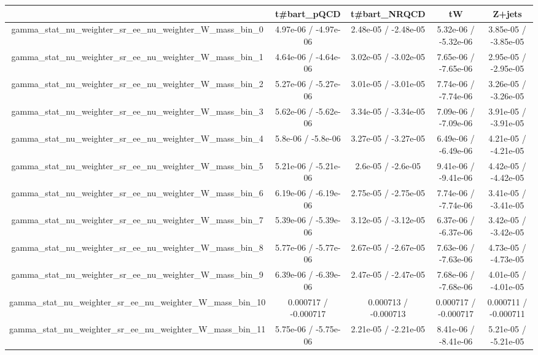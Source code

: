 \documentclass[10pt]{article}
\begin{document}
\begin{table}[htbp]
\begin{center}
\begin{tabular}{|c|c|c|c|c|}
\hline 
      & t#bar{t}_{pQCD}      & t#bar{t}_{NRQCD}      & tW      & Z+jets \\ 
\hline 
  gamma_stat_nu_weighter_sr_ee_nu_weighter_W_mass_bin_0 & 4.97e-06 / -4.97e-06 & 2.48e-05 / -2.48e-05 & 5.32e-06 / -5.32e-06 & 3.85e-05 / -3.85e-05 \\ 
  gamma_stat_nu_weighter_sr_ee_nu_weighter_W_mass_bin_1 & 4.64e-06 / -4.64e-06 & 3.02e-05 / -3.02e-05 & 7.65e-06 / -7.65e-06 & 2.95e-05 / -2.95e-05 \\ 
  gamma_stat_nu_weighter_sr_ee_nu_weighter_W_mass_bin_2 & 5.27e-06 / -5.27e-06 & 3.01e-05 / -3.01e-05 & 7.74e-06 / -7.74e-06 & 3.26e-05 / -3.26e-05 \\ 
  gamma_stat_nu_weighter_sr_ee_nu_weighter_W_mass_bin_3 & 5.62e-06 / -5.62e-06 & 3.34e-05 / -3.34e-05 & 7.09e-06 / -7.09e-06 & 3.91e-05 / -3.91e-05 \\ 
  gamma_stat_nu_weighter_sr_ee_nu_weighter_W_mass_bin_4 & 5.8e-06 / -5.8e-06 & 3.27e-05 / -3.27e-05 & 6.49e-06 / -6.49e-06 & 4.21e-05 / -4.21e-05 \\ 
  gamma_stat_nu_weighter_sr_ee_nu_weighter_W_mass_bin_5 & 5.21e-06 / -5.21e-06 & 2.6e-05 / -2.6e-05 & 9.41e-06 / -9.41e-06 & 4.42e-05 / -4.42e-05 \\ 
  gamma_stat_nu_weighter_sr_ee_nu_weighter_W_mass_bin_6 & 6.19e-06 / -6.19e-06 & 2.75e-05 / -2.75e-05 & 7.74e-06 / -7.74e-06 & 3.41e-05 / -3.41e-05 \\ 
  gamma_stat_nu_weighter_sr_ee_nu_weighter_W_mass_bin_7 & 5.39e-06 / -5.39e-06 & 3.12e-05 / -3.12e-05 & 6.37e-06 / -6.37e-06 & 3.42e-05 / -3.42e-05 \\ 
  gamma_stat_nu_weighter_sr_ee_nu_weighter_W_mass_bin_8 & 5.77e-06 / -5.77e-06 & 2.67e-05 / -2.67e-05 & 7.63e-06 / -7.63e-06 & 4.73e-05 / -4.73e-05 \\ 
  gamma_stat_nu_weighter_sr_ee_nu_weighter_W_mass_bin_9 & 6.39e-06 / -6.39e-06 & 2.47e-05 / -2.47e-05 & 7.68e-06 / -7.68e-06 & 4.01e-05 / -4.01e-05 \\ 
  gamma_stat_nu_weighter_sr_ee_nu_weighter_W_mass_bin_10 & 0.000717 / -0.000717 & 0.000713 / -0.000713 & 0.000717 / -0.000717 & 0.000711 / -0.000711 \\ 
  gamma_stat_nu_weighter_sr_ee_nu_weighter_W_mass_bin_11 & 5.75e-06 / -5.75e-06 & 2.21e-05 / -2.21e-05 & 8.41e-06 / -8.41e-06 & 5.21e-05 / -5.21e-05 \\ 

\end{tabular}
\end{center}
\end{table}
\end{document}
